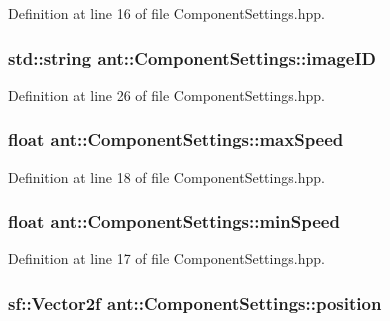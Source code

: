 Definition at line 16 of file Component\+Settings.\+hpp.

\hypertarget{classant_1_1_component_settings_abd24a47a0779d046fd85b00a79f2dc75}{
\subsubsection[{image\+I\+D}]{\setlength{\rightskip}{0pt plus 5cm}std\+::string ant\+::\+Component\+Settings\+::image\+I\+D}}\label{classant_1_1_component_settings_abd24a47a0779d046fd85b00a79f2dc75}


Definition at line 26 of file Component\+Settings.\+hpp.

\hypertarget{classant_1_1_component_settings_aa986b37a02f101f7c0ee17a4e8baf869}{
\subsubsection[{max\+Speed}]{\setlength{\rightskip}{0pt plus 5cm}float ant\+::\+Component\+Settings\+::max\+Speed}}\label{classant_1_1_component_settings_aa986b37a02f101f7c0ee17a4e8baf869}


Definition at line 18 of file Component\+Settings.\+hpp.

\hypertarget{classant_1_1_component_settings_a60bbb1cde99a1524cac65b3ea6ced5d4}{
\subsubsection[{min\+Speed}]{\setlength{\rightskip}{0pt plus 5cm}float ant\+::\+Component\+Settings\+::min\+Speed}}\label{classant_1_1_component_settings_a60bbb1cde99a1524cac65b3ea6ced5d4}


Definition at line 17 of file Component\+Settings.\+hpp.

\hypertarget{classant_1_1_component_settings_a804dcaebc434be8174762ac18fa8c8e9}{
\subsubsection[{position}]{\setlength{\rightskip}{0pt plus 5cm}sf\+::\+Vector2f ant\+::\+Component\+Settings\+::position}}\label{classant_1_1_component_settings_a804dcaebc434be8174762ac18fa8c8e9}


